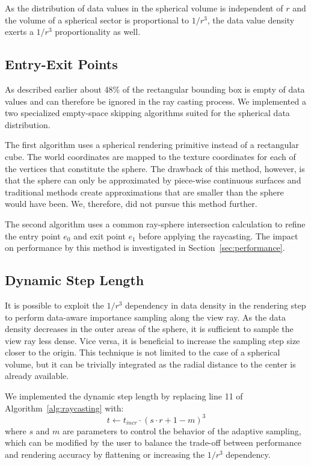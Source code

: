 \documentclass{egpubl}
\begin{document}
As the distribution of data values in the spherical volume is independent of $r$ and the volume of a spherical sector is proportional to $1/r^3$, the data value density exerts a $1/r^3$ proportionality as well.

\subsection{Entry-Exit Points}
\label{sec:entryexit}
As described earlier about 48\% of the rectangular bounding box is empty of data values and can therefore be ignored in the ray casting process. We implemented a two specialized empty-space skipping algorithms suited for the spherical data distribution.

The first algorithm uses a spherical rendering primitive instead of a rectangular cube. The world coordinates are mapped to the texture coordinates for each of the vertices that constitute the sphere. The drawback of this method, however, is that the sphere can only be approximated by piece-wise continuous surfaces and traditional methods create approximations that are smaller than the sphere would have been. We, therefore, did not pursue this method further.

The second algorithm uses a common ray-sphere intersection calculation to refine the entry point $e_0$ and exit point $e_1$ before applying the raycasting. The impact on performance by this method is investigated in Section~\ref{sec:performance}.

\subsection{Dynamic Step Length}
\label{sec:dynamicstep}
It is possible to exploit the $1/r^3$ dependency in data density in the rendering step to perform data-aware importance sampling along the view ray. As the data density decreases in the outer areas of the sphere, it is sufficient to sample the view ray less dense. Vice versa, it is beneficial to increase the sampling step size closer to the origin. This technique is not limited to the case of a spherical volume, but it can be trivially integrated as the radial distance to the center is already available.

We implemented the dynamic step length by replacing line 11 of Algorithm~\ref{alg:raycasting} with:
$$ t \gets t_{incr} \cdot \left( s \cdot r + 1 - m \right)^3 $$
where $s$ and $m$ are parameters to control the behavior of the adaptive sampling, which can be modified by the user to balance the trade-off between performance and rendering accuracy by flattening or increasing the $1/r^3$ dependency.
\end{document}
